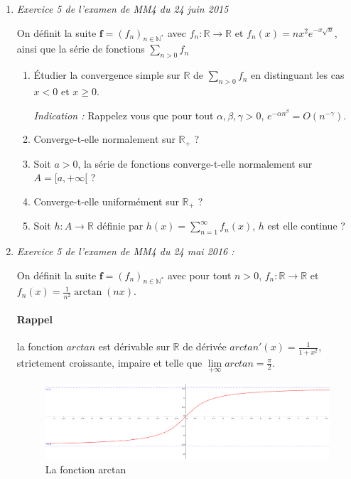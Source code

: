 \documentclass[]{article}
\begin{document}
\begin{enumerate}
\item \textit{Exercice 5 de l'examen de MM4 du 24 juin 2015}

On définit la suite $\textbf{f} = (f_n)_{n \in \mathbb{N}^*}$ avec $f_n : \mathbb{R} \longrightarrow \mathbb{R}$ et $f_n(x)=n x^2 e^{-x \sqrt{n}}$, ainsi que la série de fonctions $\displaystyle \sum_{n > 0}f_n$

\begin{enumerate}
	\item Étudier la convergence simple sur $\mathbb{R}$ de $\displaystyle \sum_{n > 0} f_n$ en distinguant les cas $x < 0$ et $x \geqslant 0$.
	
	\textit{Indication :} Rappelez vous que pour tout $\alpha, \beta, \gamma > 0$, $e^{-\alpha n^\beta}=O(n^{-\gamma})$.
	
	\item Converge-t-elle normalement sur $\mathbb{R}_+$ ?
	
	\item Soit $a > 0$, la série de fonctions converge-t-elle normalement sur $A= [a, +\infty[$ ?
	
	\item Converge-t-elle uniformément sur $\mathbb{R}_+$ ?
	
	\item Soit $h : A \longrightarrow \mathbb{R}$ définie par $\displaystyle h(x)=\sum_{n = 1}^{\infty}f_n(x)$, $h$ est elle continue ?
\end{enumerate}

\newpage
\item \textit{Exercice 5 de l'examen de MM4 du 24 mai 2016 :}

On définit la suite $\textbf{f}=(f_n)_{n \in \mathbb{N}^*}$ avec pour tout $\displaystyle n > 0$, $f_n : \mathbb{R} \longrightarrow \mathbb{R}$ et $f_n(x) = \frac{1}{n^2} \arctan(nx)$.

\paragraph{Rappel}
la fonction $arctan$ est dérivable sur $\mathbb{R}$ de dérivée $arctan'(x)=\frac{1}{1+x^2}$, strictement croissante, impaire et telle que $\displaystyle \lim\limits_{+\infty} arctan = \frac{\pi}{2}$.

\begin{figure}[!h]
	\centering
	\includegraphics[width=350pt]{Images/Arctan}
	\caption{La fonction arctan}
\end{figure}


\end{enumerate}
\end{document}
